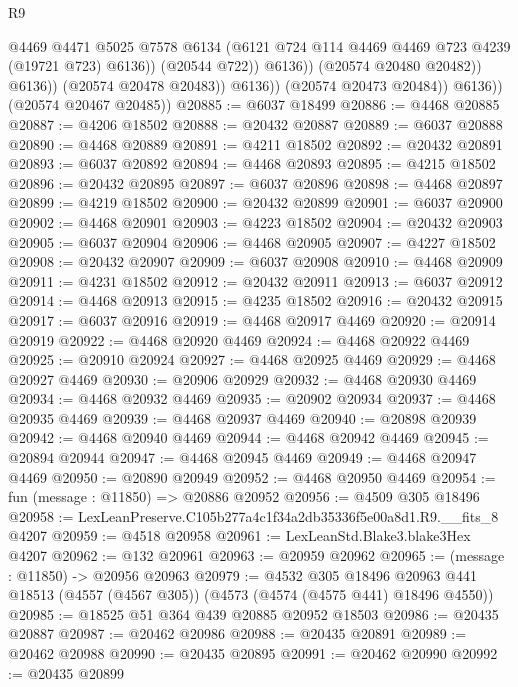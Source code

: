\begin{lexlean}{R9}
\begin{coremodule}
                                @4469
                                @4471
                                @5025
                                @7578
                                @6134
                                (@6121 @724 @114 @4469 @4469 @723 @4239 (@19721 @723) @6136))
                              (@20544 @722))
                            @6136))
                        (@20574 @20480 @20482))
                      @6136))
                  (@20574 @20478 @20483))
                @6136))
            (@20574 @20473 @20484))
          @6136))
      (@20574 @20467 @20485))
@20885 := @6037 @18499
@20886 := @4468 @20885
@20887 := @4206 @18502
@20888 := @20432 @20887
@20889 := @6037 @20888
@20890 := @4468 @20889
@20891 := @4211 @18502
@20892 := @20432 @20891
@20893 := @6037 @20892
@20894 := @4468 @20893
@20895 := @4215 @18502
@20896 := @20432 @20895
@20897 := @6037 @20896
@20898 := @4468 @20897
@20899 := @4219 @18502
@20900 := @20432 @20899
@20901 := @6037 @20900
@20902 := @4468 @20901
@20903 := @4223 @18502
@20904 := @20432 @20903
@20905 := @6037 @20904
@20906 := @4468 @20905
@20907 := @4227 @18502
@20908 := @20432 @20907
@20909 := @6037 @20908
@20910 := @4468 @20909
@20911 := @4231 @18502
@20912 := @20432 @20911
@20913 := @6037 @20912
@20914 := @4468 @20913
@20915 := @4235 @18502
@20916 := @20432 @20915
@20917 := @6037 @20916
@20919 := @4468 @20917 @4469
@20920 := @20914 @20919
@20922 := @4468 @20920 @4469
@20924 := @4468 @20922 @4469
@20925 := @20910 @20924
@20927 := @4468 @20925 @4469
@20929 := @4468 @20927 @4469
@20930 := @20906 @20929
@20932 := @4468 @20930 @4469
@20934 := @4468 @20932 @4469
@20935 := @20902 @20934
@20937 := @4468 @20935 @4469
@20939 := @4468 @20937 @4469
@20940 := @20898 @20939
@20942 := @4468 @20940 @4469
@20944 := @4468 @20942 @4469
@20945 := @20894 @20944
@20947 := @4468 @20945 @4469
@20949 := @4468 @20947 @4469
@20950 := @20890 @20949
@20952 := @4468 @20950 @4469
@20954 := fun (message : @11850) => @20886 @20952
@20956 := @4509 @305 @18496
@20958 := LexLeanPreserve.C105b277a4c1f34a2db35336f5e00a8d1.R9.__fits_8 @4207
@20959 := @4518 @20958
@20961 := LexLeanStd.Blake3.blake3Hex @4207
@20962 := @132 @20961
@20963 := @20959 @20962
@20965 := (message : @11850) -> @20956 @20963
@20979 := @4532
    @305
    @18496
    @20963
    @441
    @18513
    (@4557 (@4567 @305))
    (@4573 (@4574 (@4575 @441) @18496 @4550))
@20985 := @18525 @51 @364 @439 @20885 @20952 @18503
@20986 := @20435 @20887
@20987 := @20462 @20986
@20988 := @20435 @20891
@20989 := @20462 @20988
@20990 := @20435 @20895
@20991 := @20462 @20990
@20992 := @20435 @20899

\end{coremodule}
\end{lexlean}
